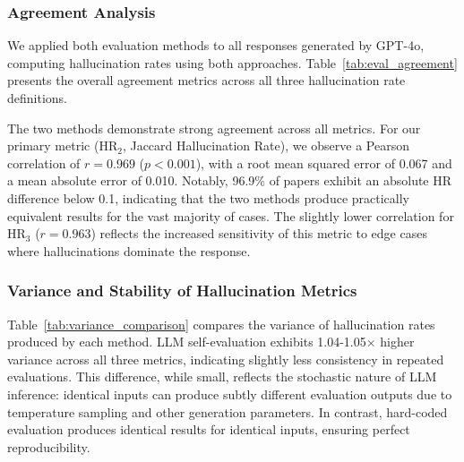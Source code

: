\documentclass[11pt]{article}
\begin{document}
\subsubsection{Agreement Analysis}

\begin{table}[htbp]
\setlength{\tabcolsep}{2.5pt}
  \centering
{}
    \caption{Agreement Between LLM Self-Evaluation and Hard-coded Evaluation. Agreement: \% of papers with absolute HR difference $<$ 0.1 between eval methods.}
  \label{tab:eval_agreement}

\end{table}

We applied both evaluation methods to all responses generated by GPT-4o, computing hallucination rates using both approaches. Table~\ref{tab:eval_agreement} presents the overall agreement metrics across all three hallucination rate definitions.

The two methods demonstrate strong agreement across all metrics. For our primary metric (HR$_2$, Jaccard Hallucination Rate), we observe a Pearson correlation of $r = 0.969$ ($p < 0.001$), with a root mean squared error of 0.067 and a mean absolute error of 0.010. Notably, 96.9\% of papers exhibit an absolute HR difference below 0.1, indicating that the two methods produce practically equivalent results for the vast majority of cases. The slightly lower correlation for HR$_3$ ($r = 0.963$) reflects the increased sensitivity of this metric to edge cases where hallucinations dominate the response.

\subsubsection{Variance and Stability of Hallucination Metrics\label{sec:appendix_HRs}}

Table~\ref{tab:variance_comparison} compares the variance of hallucination rates produced by each method. LLM self-evaluation exhibits 1.04-1.05$\times$ higher variance across all three metrics, indicating slightly less consistency in repeated evaluations. This difference, while small, reflects the stochastic nature of LLM inference: identical inputs can produce subtly different evaluation outputs due to temperature sampling and other generation parameters. In contrast, hard-coded evaluation produces identical results for identical inputs, ensuring perfect reproducibility.
\end{document}
